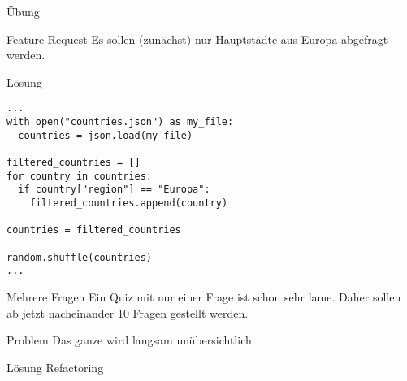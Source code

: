 \begin{frame}{Übung}

\begin{block}{Feature Request}
\vspace{2pt}
Es sollen (zunächst) nur Hauptstädte aus Europa abgefragt werden.
\end{block}
	
\end{frame}


\begin{fragile}{}
\begin{block}{Lösung}
\begin{verbatim}
...
with open("countries.json") as my_file:
  countries = json.load(my_file)

filtered_countries = []
for country in countries: 
  if country["region"] == "Europa": 
    filtered_countries.append(country)

countries = filtered_countries

random.shuffle(countries)
...
\end{verbatim}
\end{block}
\end{fragile}


\begin{frame}
	
\begin{block}{Mehrere Fragen}
\vspace{2pt}
Ein Quiz mit nur einer Frage ist schon sehr lame. Daher sollen ab jetzt nacheinander 10 Fragen gestellt werden. 	
\end{block}

\pause 
\vspace{12pt}

\begin{alertblock}{Problem}
\vspace{2pt}
Das ganze wird langsam unübersichtlich.	
\end{alertblock}

\pause
\vspace{12pt}
\begin{exampleblock}{Lösung}
	\vspace{2pt}
Refactoring
\end{exampleblock}

\end{frame}

